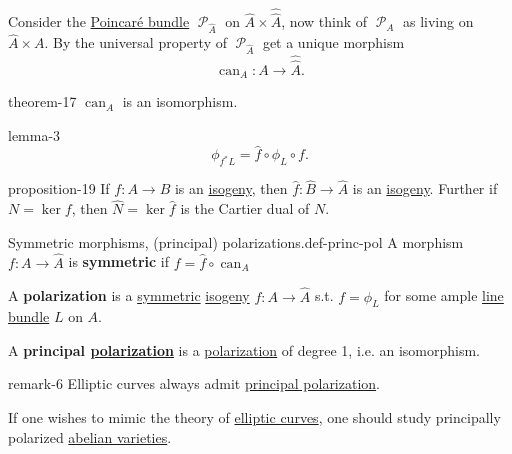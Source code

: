 \documentclass[10pt,]{book}
\newcommand{\terminology}[1]{\textbf{#1}}
\numberwithin{equation}{section}
\newcommand{\sheaf}[1]{\operatorname{\mathcal{#1}}}
\begin{document}
Consider the \hyperref[thm-poincare-bundle]{Poincaré bundle} \(\sheaf P_{\hat A}\) on \(\hat A \times \hat{\hat{A}}\), now think of \(\sheaf P_A\) as living on \(\hat A \times A\). By the universal property of \(\sheaf P_{\hat A}\) get a unique morphism%
\begin{equation*}
\operatorname{can}_A\colon A\to\hat{\hat A}\text{.}
\end{equation*}
%
\begin{theorem}{}{}{theorem-17}%
\hypertarget{p-199}{}%
\(\operatorname{can}_A\) is an isomorphism.%
\end{theorem}
\begin{lemma}{}{}{lemma-3}%
\hypertarget{p-200}{}%
%
\begin{equation*}
\phi_{f^*L} = \hat f\circ \phi_L\circ f\text{.}
\end{equation*}
%
\end{lemma}
\begin{proposition}{}{}{proposition-19}%
\hypertarget{p-201}{}%
If \(f\colon A \to B\) is an \hyperref[def-supersing-isog-isog]{isogeny}, then \(\hat f\colon \hat B \to \hat A\) is an \hyperref[def-supersing-isog-isog]{isogeny}. Further if \(N  = \ker f\), then \(\hat N = \ker \hat f\) is the Cartier  dual of \(N\).%
\end{proposition}
\begin{definition}{Symmetric morphisms, (principal) polarizations.}{def-princ-pol}%
\hypertarget{p-202}{}%
A morphism \(f\colon A \to \hat A\) is \terminology{symmetric} if \(f = \hat f\circ \operatorname{can}_A\)%
\par
\hypertarget{p-203}{}%
A \terminology{polarization} is a \hyperref[def-princ-pol]{symmetric} \hyperref[def-supersing-isog-isog]{isogeny} \(f\colon A \to \hat A\) s.t. \(f=  \phi_L\) for some ample \hyperref[def-line-bundle]{line bundle} \(L\) on \(A\).%
\par
\hypertarget{p-204}{}%
A \terminology{principal \hyperref[def-polarization]{polarization}} is a \hyperref[def-polarization]{polarization} of degree 1, i.e. an isomorphism.%
\end{definition}
\begin{remark}{}{remark-6}%
\hypertarget{p-205}{}%
Elliptic curves always admit \hyperref[def-polarization]{principal polarization}.%
\par
\hypertarget{p-206}{}%
If one wishes to mimic the theory of \hyperref[def-supersing-isog-ec]{elliptic curves}, one should study principally polarized \hyperref[def-buntes-abvar]{abelian varieties}.%
\end{remark}
%
%
\typeout{************************************************}
\typeout{************************************************}
%
\end{document}
